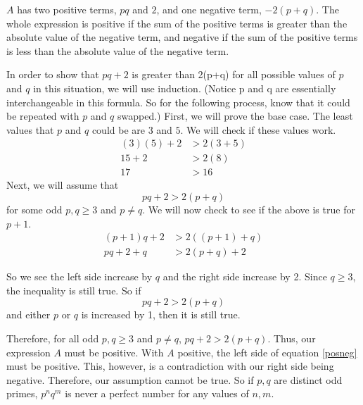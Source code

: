 \documentclass[12pt]{article}
\begin{document}
$A$ has two positive terms, $pq$ and $2$, and one negative term, $-2(p+q)$. The whole expression is positive if the sum of the positive terms is greater than the absolute value of the negative term, and negative if the sum of the positive terms is less than the absolute value of the negative term.

In order to show that $pq +2$ is greater than 2(p+q) for all possible values of $p$ and $q$ in this situation, we will use induction. (Notice p and q are essentially interchangeable in this formula. So for the following process, know that it could be repeated with $p$ and $q$ swapped.) First, we will prove the base case. The least values that $p$ and $q$ could be are $3$ and $5$. We will check if these values work.
\begin{align*}
   (3)(5) + 2 &> 2(3+5) \\
    15 + 2 &> 2(8) \\
    17 &> 16
\end{align*}
Next, we will assume that
\[pq + 2 > 2(p+q)\]
for some odd $p,q \geq 3$ and $p \ne q$.  We will now check to see if the above is true for $p+1$.
\begin{align*}
    (p+1)q + 2 &> 2((p+1)+q) \\
    pq + 2 + q &> 2(p+q) + 2
\end{align*}

So we see the left side increase by $q$ and the right side increase by 2. Since $q \geq 3$, the inequality is still true. So if
\[pq + 2 > 2(p+q)\]
and either $p$ or $q$ is increased by 1, then it is still true. 

Therefore, for all odd $p,q \geq 3$ and $p \ne q$, $pq + 2 > 2(p+q)$. Thus, our expression $A$ must be positive. With $A$ positive, the left side of equation \ref{posneg} must be positive. This, however, is a contradiction with our right side being negative. Therefore, our assumption cannot be true. So if $p,q$ are distinct odd primes, $p^nq^m$ is never a perfect number for any values of $n,m$.
    
\end{document}
